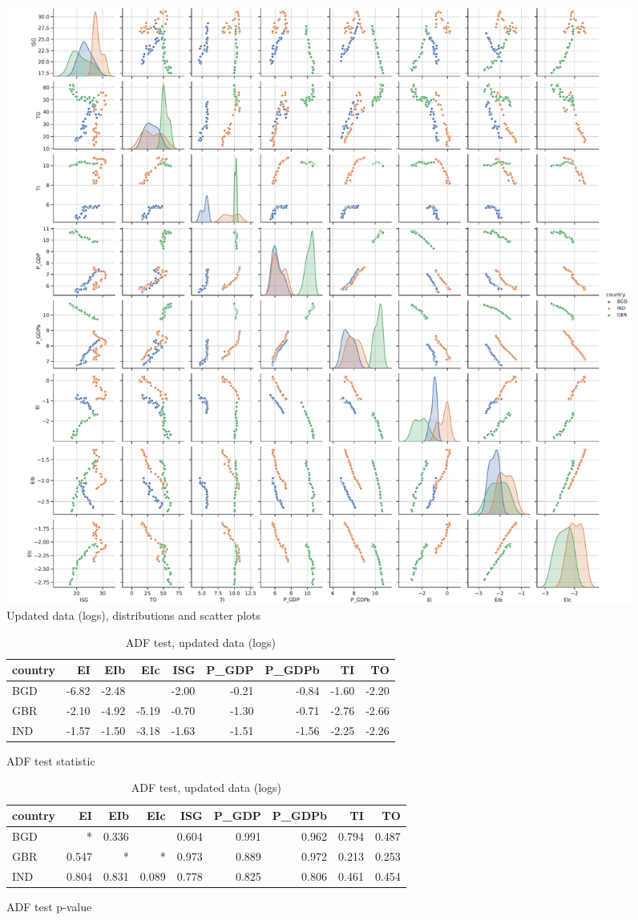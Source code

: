 \documentclass[11pt,a4paper]{article}
\begin{document}
\begin{figure}[htbp]
\centering
\includegraphics[width=\textwidth]{./plots/log_pairplot.pdf}
\caption{Updated data (logs), distributions and scatter plots}
\label{fig:log_scatterplot}
\end{figure}

\begin{table}[htbp]
\begin{subfigure}{\textwidth}
\centering
\begin{tabular}{lrrrrrrrr}
\toprule
country &    EI &   EIb &   EIc &   ISG &  P\_GDP &  P\_GDPb &    TI &    TO \\
\midrule
    BGD & -6.82 & -2.48 &       & -2.00 &  -0.21 &   -0.84 & -1.60 & -2.20 \\
    GBR & -2.10 & -4.92 & -5.19 & -0.70 &  -1.30 &   -0.71 & -2.76 & -2.66 \\
    IND & -1.57 & -1.50 & -3.18 & -1.63 &  -1.51 &   -1.56 & -2.25 & -2.26 \\
\bottomrule
\end{tabular}
\caption{ADF test statistic}
\end{subfigure}
\begin{subfigure}{\textwidth}
\centering
\begin{tabular}{lrrrrrrrr}
\toprule
country &    EI &   EIb &   EIc &   ISG &  P\_GDP &  P\_GDPb &    TI &    TO \\
\midrule
    BGD &     * & 0.336 &       & 0.604 &  0.991 &   0.962 & 0.794 & 0.487 \\
    GBR & 0.547 &     * &     * & 0.973 &  0.889 &   0.972 & 0.213 & 0.253 \\
    IND & 0.804 & 0.831 & 0.089 & 0.778 &  0.825 &   0.806 & 0.461 & 0.454 \\
\bottomrule
\end{tabular}
\caption[ADF test p-value]{ADF test p-value\footnotemark}
\end{subfigure}
\caption{ADF test, updated data (logs)}
\label{tab:adf_log}
\end{table}
\end{document}
